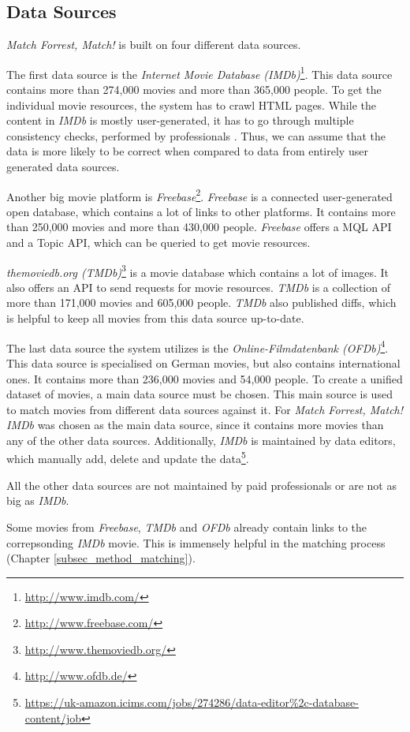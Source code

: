 \subsection{Data Sources}
\label{subsec_method_datasources}

\emph{Match Forrest, Match!} is built on four different data sources.

The first data source is the \textit{Internet Movie Database (IMDb)}\footnote{\url{http://www.imdb.com/}}.
This data source contains more than 274,000 movies and more than 365,000 people.
To get the individual movie resources, the system has to crawl HTML pages.
While the content in \textit{IMDb} is mostly user-generated, it has to go through multiple consistency checks, performed by professionals \cite{IMDb_DataCreation}.
Thus, we can assume that the data is more likely to be correct when compared to data from entirely user generated data sources.

Another big movie platform is \textit{Freebase}\footnote{\url{http://www.freebase.com/}}.
\textit{Freebase} is a connected user-generated open database, which contains a lot of links to other platforms.
It contains more than 250,000 movies and more than 430,000 people.
\textit{Freebase} offers a MQL API and a Topic API, which can be queried to get movie resources.

\textit{themoviedb.org (TMDb)}\footnote{\url{http://www.themoviedb.org/}} is a movie database which contains a lot of images.
It also offers an API to send requests for movie resources.
\textit{TMDb} is a collection of more than 171,000 movies and 605,000 people.
\textit{TMDb} also published diffs, which is helpful to keep all movies from this data source up-to-date.

The last data source the system utilizes is the \textit{Online-Filmdatenbank (OFDb)}\footnote{\url{http://www.ofdb.de/}}.
This data source is specialised on German movies, but also contains international ones.
It contains more than 236,000 movies and 54,000 people.
To create a unified dataset of movies, a main data source must be chosen.
This main source is used to match movies from different data sources against it.
For \emph{Match Forrest, Match!} \textit{IMDb} was chosen as the main data source, since it contains more movies than any of the other data sources.
Additionally, \textit{IMDb} is maintained by data editors, which manually add, delete and update the data\footnote{\url{https://uk-amazon.icims.com/jobs/274286/data-editor\%2c-database-content/job}}.

All the other data sources are not maintained by paid professionals or are not as big as \textit{IMDb}.

Some movies from \textit{Freebase}, \textit{TMDb} and \textit{OFDb} already contain links to the correpsonding \textit{IMDb} movie.
This is immensely helpful in the matching process (Chapter \ref{subsec_method_matching}).